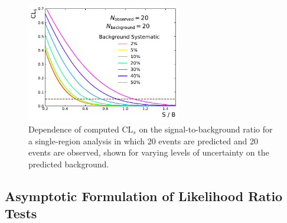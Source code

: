 \begin{figure}[!htb]
    \begin{center}
        \includegraphics[width=0.6\textwidth]{figures/common_ana/stat_hypo/cls_bkguncert_scan}
        \caption{
            Dependence of computed CL$_s$ on the signal-to-background ratio for a single-region
            analysis in which 20 events are predicted and 20 events are observed, shown
            for varying levels of uncertainty on the predicted background.
        }
        \label{fig:cls_scan_uncert}
    \end{center}
\end{figure}

\FloatBarrier
\subsection{Asymptotic Formulation of Likelihood Ratio Tests}

{\color{red}{Describe the asympotitc formula used for the analysis to be presented and illustrate
examples of how various p values are obtained, as well as how analysis sensitivity is optimized}}
